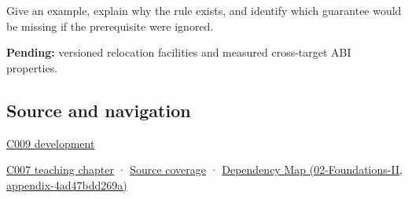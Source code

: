 Give an example, explain why the rule exists, and identify which guarantee would be missing if the prerequisite were ignored.

\textbf{Pending:} versioned relocation facilities and measured cross-target ABI properties.

\subsection{Source and navigation}\label{appendix-958870a64c53-source-and-navigation}

\hyperref[appendix-fd090d982a15-m009---parts-127-147]{C009 development}

\hyperref[01-foundations-i-ch003-bringing-the-object-model-back-to-bytes]{C007 teaching chapter} · \hyperref[appendix-fd090d982a15-m007---parts-101-112]{Source coverage} · \href{../02-Foundations-II/main.pdf\#nameddest=appendix-4ad47bdd269a}{Dependency Map (02-Foundations-II, appendix-4ad47bdd269a)}

